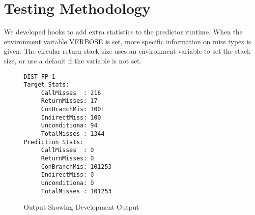 \section{Testing Methodology}
We developed hooks to add extra statistics to the predictor runtime. When the environment variable VERBOSE is set, more specific information on miss types is given. The circular return stack size uses an environment variable to set the stack size, or use a default if the variable is not set.

\begin{figure}
\begin{verbatim}
DIST-FP-1
Target Stats:
     CallMisses  : 216
     ReturnMisses: 17
     ConBranchMis: 1001
     IndirectMiss: 100
     Unconditiona: 94
     TotalMisses : 1344
Prediction Stats:
     CallMisses  : 0
     ReturnMisses: 0
     ConBranchMis: 101253
     IndirectMiss: 0
     Unconditiona: 0
     TotalMisses : 101253
\end{verbatim}
\caption{Output Showing Development Output}
\end{figure}